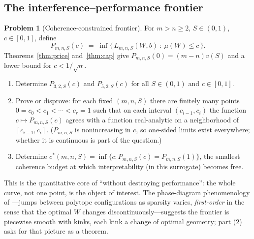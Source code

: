 \documentclass[11pt]{amsart}
\theoremstyle{plain}
\theoremstyle{definition}
\newtheorem{problem}[theorem]{Problem}
\begin{document}
\subsection{The interference--performance frontier}

\begin{problem}[Coherence-constrained frontier]\label{prob:frontier}
For $m>n\ge2$, $S\in(0,1)$, $c\in[0,1]$, define
\[
P_{m,n,S}(c) \;=\; \inf\bigl\{\,L_{m,n,S}(W,b)\ :\ \mu(W)\le c\,\bigr\}.
\]
Theorems~\ref{thm:price} and~\ref{thm:cap} give $P_{m,n,S}(0)=(m-n)v(S)$ and a lower bound for $c<1/\sqrt n$.
\begin{enumerate}
\item Determine $P_{3,2,S}(c)$ and $P_{5,2,S}(c)$ for all $S\in(0,1)$ and $c\in[0,1]$.
\item Prove or disprove: for each fixed $(m,n,S)$ there are finitely many points $0=c_0<c_1<\cdots<c_r=1$ such that on each interval $(c_{i-1},c_i)$ the function $c\mapsto P_{m,n,S}(c)$ agrees with a function real-analytic on a neighborhood of $[c_{i-1},c_i]$. ($P_{m,n,S}$ is nonincreasing in $c$, so one-sided limits exist everywhere; whether it is continuous is part of the question.)
\item Determine $c^*(m,n,S)=\inf\{c: P_{m,n,S}(c)=P_{m,n,S}(1)\}$, the smallest coherence budget at which interpretability (in this surrogate) becomes free.
\end{enumerate}
\end{problem}

This is the quantitative core of ``without destroying performance'': the whole curve, not one point, is the object of interest. The phase-diagram phenomenology of \cite{elhage2022}---jumps between polytope configurations as sparsity varies, \emph{first-order} in the sense that the optimal $W$ changes discontinuously---suggests the frontier is piecewise smooth with kinks, each kink a change of optimal geometry; part (2) asks for that picture as a theorem.
\end{document}
